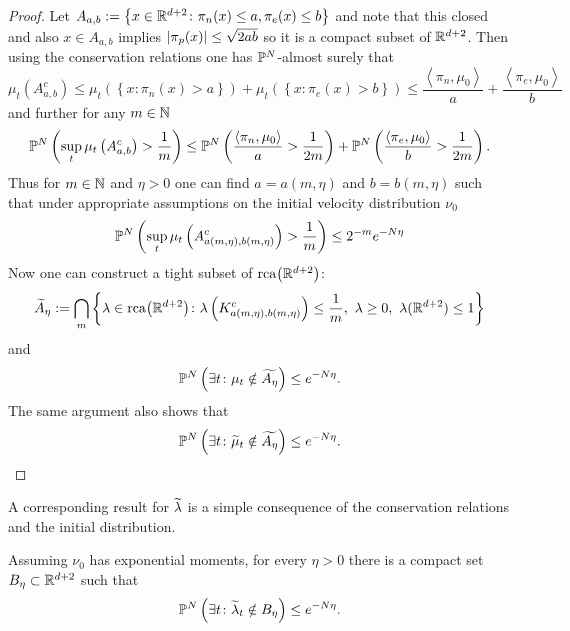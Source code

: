 \begin{proof}
Let $A_{a,b} := \left\{x \in \mathbb{R}^{d+2} \colon \pi_n(x) \leq a, \pi_e(x) \leq b \right\}$ and note that this closed and also $x\in A_{a,b}$ implies $\left\lvert{\pi_p(x)}\right\rvert \leq \sqrt{2ab}$ so it is a compact subset of $\mathbb{R}^{d+2}$.
Then using the conservation relations one has $\mathbb{P}^N$-almost surely that
\begin{equation}
    \mu_t\left(A_{a,b}^c\right)
    \leq
    \mu_t\left(\left\{x\colon \pi_n(x) > a\right\}\right)
    +\mu_t\left(\left\{x\colon \pi_e(x) > b\right\}\right)
    \leq
    \frac{\left<\pi_n,\mu_0\right>}{a} + \frac{\left<\pi_e,\mu_0\right>}{b}
\end{equation}
and further for any $m \in \mathbb{N}$
\begin{equation}
    \mathbb{P}^N\left(\sup_t \mu_t\left(A_{a,b}^c\right) > \frac1m \right)
    \leq
    \mathbb{P}^N\left( \frac{\left<\pi_n,\mu_0\right>}{a} > \frac{1}{2m}\right)
    + \mathbb{P}^N\left( \frac{\left<\pi_e,\mu_0\right>}{b} > \frac{1}{2m}\right).
\end{equation}
Thus for $m\in\mathbb{N}$ and $\eta> 0$ one can find $a=a(m,\eta)$ and $b=b(m,\eta)$ such that under appropriate assumptions on the initial velocity distribution $\nu_0$
\begin{equation}
    \mathbb{P}^N\left(\sup_t \mu_t\left(A_{a(m,\eta),b(m,\eta)}^c\right) > \frac1m \right)
    \leq
    2^{-m}e^{-N \eta}
\end{equation}
Now one can construct a tight subset of $\mathrm{rca}{\left({\mathbb{R}^{d+2}}\right)}$:
\begin{equation*}
    \widetilde{A}_{\eta} := \bigcap_m \left\{\lambda \in \rca{\RR^{d+2}} \colon
    \lambda\left(K_{a(m,\eta),b(m,\eta)}^c\right) \leq \frac1m, \ 
    \lambda \geq 0, \ \lambda(\RR^{d+2}) \leq 1 \right\}
\end{equation*}
and
\begin{equation*}
    \mathbb{P}^N\left(\exists t \colon \mu_t \notin \widetilde{A_\eta} \right)
    \leq e^{-N \eta}.
\end{equation*}
The same argument also shows that 
\begin{equation*}
    \mathbb{P}^N\left(\exists t \colon \widetilde{\mu}_t \notin \widetilde{A_\eta} \right)
    \leq e^{-N \eta}.
\end{equation*}
\end{proof}

A corresponding result for $\widetilde{\lambda}$ is a simple consequence of the conservation relations and the initial distribution.
\begin{proposition}
Assuming $\nu_0$ has exponential moments, for every $\eta > 0$ there is a compact set $B_\eta \subset \mathbb{R}^{d+2}$ such that
\begin{equation*}
    \mathbb{P}^N\left(\exists t \colon \widetilde{\lambda}_t \notin B_\eta \right) \leq e^{-N\eta}.
\end{equation*}
\end{proposition}

